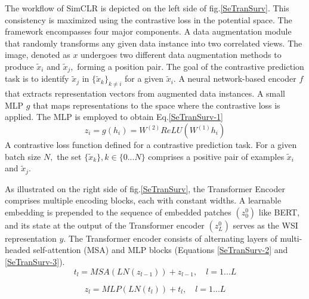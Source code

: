 \documentclass[journal,twoside,web]{ieeecolor}
\begin{document}
The workflow of SimCLR is depicted on the left side of fig.\ref{SeTranSurv}. This consistency is maximized using the contrastive loss\cite{he2020momentum} in the potential space. 
The framework encompasses four major components.
A data augmentation module that randomly transforms any given data instance into two correlated views. 
The image, denoted as $x$ undergoes two different data augmentation methods to produce $\widetilde{x}_i$ and $\widetilde{x}_j,$ forming a position pair.
The goal of the contrastive prediction task is to identify $\widetilde{x}_j$ in $\{\widetilde{x}_k\}_{k\neq i}$ for a given $\widetilde{x}_i$.
A neural network-based encoder $f$ that extracts representation vectors from augmented data instances. 
A small MLP $g$ that maps representations to the space where the contrastive loss is applied. 
The MLP is employed to obtain Eq.\ref{SeTranSurv-1}
\begin{equation}\label{SeTranSurv-1}
z_i=g(h_i)=W^{(2)}ReLU(W^{(1)}h_i)
\end{equation}
A contrastive loss function defined for a contrastive prediction task. 
For a given batch size $N,$ the set $\{\widetilde{x}_k\}, k\in\{0...N\}$ comprises a positive pair of examples $\widetilde{x}_i$ and $\widetilde{x}_j$. 

As illustrated on the right side of fig.\ref{SeTranSurv}, the Transformer Encoder\cite{dosovitskiy2020image} comprises multiple encoding blocks, each with constant widths. 
A learnable embedding is prepended to the sequence of embedded patches $(z_0^0)$ like BERT\cite{devlin2018bert}, and its state at the output of the Transformer encoder $(z_L^0)$ serves as the WSI representation $y$. 
The Transformer encoder consists of alternating layers of multi-headed self-attention (MSA) and MLP blocks (Equations \ref{SeTranSurv-2} and \ref{SeTranSurv-3}).
\begin{equation}\label{SeTranSurv-2}
t_l=MSA(LN(z_{l-1}))+z_{l-1},\quad l=1...L
\end{equation}

\begin{equation}\label{SeTranSurv-3}
{z}_l=MLP(LN(t_l))+t_l,\quad l=1...L
\end{equation}
\end{document}
